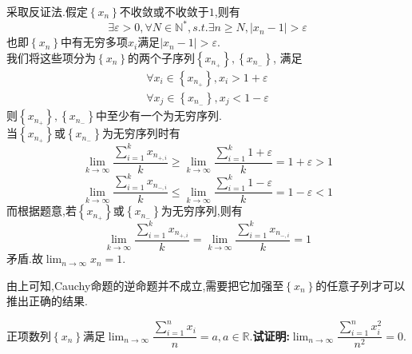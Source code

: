 \documentclass[a4paper]{ctexart}
\begin{document}
\begin{solution}[Proof.]
    采取反证法.假定$\left\{ x_n\right\}$不收敛或不收敛于$1$,则有
    $$\exists\varepsilon>0,\forall N\in\mathbb{N}^*,s.t.\exists n\geqslant N,\left\lvert x_n-1\right\rvert>\varepsilon$$
    也即$\left\{ x_n\right\}$中有无穷多项$x_i$满足$\left\lvert x_n-1\right\rvert>\varepsilon$.\\
    我们将这些项分为$\left\{ x_n\right\}$的两个子序列$\left\{ x_{n_+}\right\},\left\{ x_{n_-}\right\}$,
    满足$$\begin{aligned}
    \forall x_i\in\left\{ x_{n_+}\right\},x_i>1+\varepsilon \\
    \forall x_j\in\left\{ x_{n_-}\right\},x_j<1-\varepsilon
    \end{aligned}$$
    则$\left\{ x_{n_+}\right\},\left\{ x_{n_-}\right\}$中至少有一个为无穷序列.\\
    当$\left\{ x_{n_+}\right\}$或$\left\{ x_{n_-}\right\}$为无穷序列时有
    $$\lim_{k\to\infty}{\dfrac{\sum_{i=1}^{k}{x_{n_{+,i}}}}{k}}\geqslant \lim_{k\to\infty}{\dfrac{\sum_{i=1}^{k}{1+\varepsilon}}{k}}=1+\varepsilon>1$$
    $$\lim_{k\to\infty}{\dfrac{\sum_{i=1}^{k}{x_{n_{-,i}}}}{k}}\leqslant \lim_{k\to\infty}{\dfrac{\sum_{i=1}^{k}{1-\varepsilon}}{k}}=1-\varepsilon<1$$
    而根据题意,若$\left\{ x_{n_+}\right\}$或$\left\{ x_{n_-}\right\}$为无穷序列,则有
    $$\lim_{k\to\infty}{\dfrac{\sum_{i=1}^{k}{x_{n_{+,i}}}}{k}}=\lim_{k\to\infty}{\dfrac{\sum_{i=1}^{k}{x_{n_{-,i}}}}{k}=1}$$
    矛盾.故$\displaystyle\lim_{n\to\infty}{x_n}=1$.
\end{solution}
\begin{theorem}
    由上可知,Cauchy命题的逆命题并不成立,需要把它加强至$\left\{x_n\right\}$的任意子列才可以推出正确的结果.
\end{theorem}
\begin{problem}[例2(24.10.09 SJTU数分小测).]
    正项数列$\left\{ x_n\right\}$满足$\displaystyle\lim_{n\to\infty}{\dfrac{\sum_{i=1}^{n}{x_i}}{n}}=a,a\in\mathbb{R}$.\textbf{试证明:}$\displaystyle\lim_{n\to\infty}{\dfrac{\sum_{i=1}^{n}{x_i^2}}{n^2}}=0$.
\end{problem}
\end{document}
